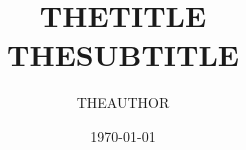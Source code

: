 %
%

\def\thetitle{THETITLE}
\def\thesubtitle{THESUBTITLE}
\def\thesubject{THESUBJECT}
\def\theautor{THEAUTHOR}
\def\thedate{\today}

\def\pdfkeywords{}
\def\pdfcreator{}

\title{\thetitle\\{\Large \thesubtitle}}
\author{\theautor}
\date{\today}

